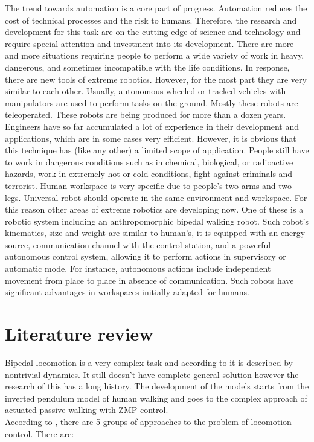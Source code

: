 \documentclass[12pt,a4paper]{report}
\begin{document}
		The trend towards automation is a core part of progress. Automation reduces the cost of technical processes and the risk to humans. Therefore, the research and development for this task are on the cutting edge of science and technology and require special attention and investment into its development. There are more and more situations requiring people to perform a wide variety of work in heavy, dangerous, and sometimes incompatible with the life conditions. In response, there are new tools of extreme robotics. However, for the most part they are very similar to each other. Usually, autonomous wheeled or tracked vehicles with manipulators are used to perform tasks on the ground. Mostly these robots are teleoperated. These robots are being produced for more than a dozen years. Engineers have so far accumulated a lot of experience in their development and applications, which are in some cases very efficient. However, it is obvious that this technique has (like any other) a limited scope of application. People still have to work in dangerous conditions such as in chemical, biological, or radioactive hazards, work in extremely hot or cold conditions, fight against criminals and terrorist.
		Human workspace is very specific due to people's two arms and two legs. Universal robot should operate in the same environment and workspace. For this reason other areas of extreme robotics are developing now.
		One of these is a robotic system including an anthropomorphic bipedal walking robot. Such robot's kinematics, size and weight are similar to human's, it is equipped with an energy source, communication channel with the control station, and a powerful autonomous control system, allowing it to perform actions in supervisory or automatic mode. For instance, autonomous actions include independent movement from place to place in absence of communication. Such robots have significant advantages in workspaces initially adapted for humans.

	\chapter{Literature review}
		Bipedal locomotion is a very complex task and according to \cite{erbatur2002study} it is described by nontrivial dynamics. It still doesn't have complete general solution however the research of this has a long history. The development of the models starts from the inverted pendulum model of human walking and goes to the complex approach of actuated passive walking with ZMP control.\\
		According to \cite{wright2014intelligent}, there are 5 groups of approaches to the problem of locomotion control. There are:
		
\end{document}
